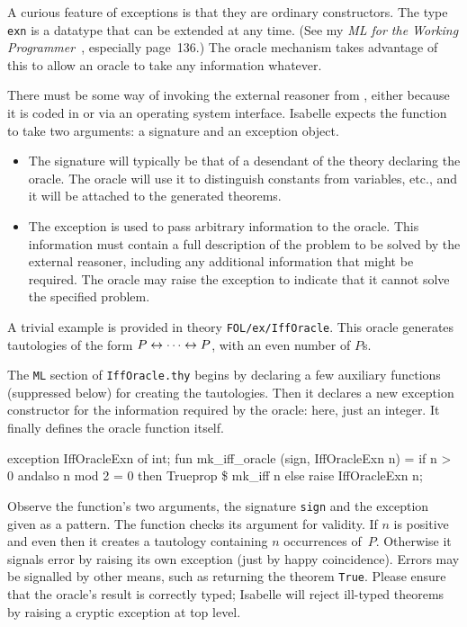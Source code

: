 A curious feature of {\ML} exceptions is that they are ordinary constructors.
The {\ML} type \texttt{exn} is a datatype that can be extended at any time.  (See
my {\em {ML} for the Working Programmer}~\cite{paulson-ml2}, especially
page~136.)  The oracle mechanism takes advantage of this to allow an oracle to
take any information whatever.

There must be some way of invoking the external reasoner from \ML, either
because it is coded in {\ML} or via an operating system interface.  Isabelle
expects the {\ML} function to take two arguments: a signature and an
exception object.
\begin{itemize}
\item The signature will typically be that of a desendant of the theory
  declaring the oracle.  The oracle will use it to distinguish constants from
  variables, etc., and it will be attached to the generated theorems.

\item The exception is used to pass arbitrary information to the oracle.  This
  information must contain a full description of the problem to be solved by
  the external reasoner, including any additional information that might be
  required.  The oracle may raise the exception to indicate that it cannot
  solve the specified problem.
\end{itemize}

A trivial example is provided in theory \texttt{FOL/ex/IffOracle}.  This
oracle generates tautologies of the form $P\leftrightarrow\cdots\leftrightarrow P$, with
an even number of $P$s.

The \texttt{ML} section of \texttt{IffOracle.thy} begins by declaring
a few auxiliary functions (suppressed below) for creating the
tautologies.  Then it declares a new exception constructor for the
information required by the oracle: here, just an integer. It finally
defines the oracle function itself.
\begin{ttbox}
exception IffOracleExn of int;\medskip
fun mk_iff_oracle (sign, IffOracleExn n) =
  if n > 0 andalso n mod 2 = 0
  then Trueprop \$ mk_iff n
  else raise IffOracleExn n;
\end{ttbox}
Observe the function's two arguments, the signature \texttt{sign} and the
exception given as a pattern.  The function checks its argument for
validity.  If $n$ is positive and even then it creates a tautology
containing $n$ occurrences of~$P$.  Otherwise it signals error by
raising its own exception (just by happy coincidence).  Errors may be
signalled by other means, such as returning the theorem \texttt{True}.
Please ensure that the oracle's result is correctly typed; Isabelle
will reject ill-typed theorems by raising a cryptic exception at top
level.

